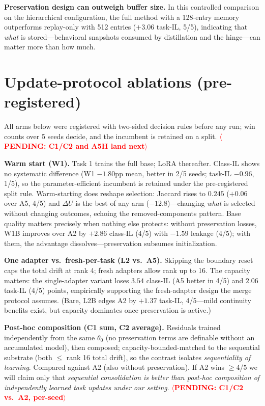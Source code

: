 \documentclass[11pt]{article}
\newcommand{\pending}[1]{\textcolor{red}{\textbf{$\langle$PENDING: #1$\rangle$}}}
\begin{document}
\textbf{Preservation design can outweigh buffer size.} In this controlled comparison on the hierarchical configuration, the full method with a 128-entry memory outperforms replay-only with 512 entries ($+3.06$ task-IL, 5/5), indicating that \emph{what} is stored---behavioral snapshots consumed by distillation and the hinge---can matter more than how much.

\section{Update-protocol ablations (pre-registered)}\label{sec:ablations}
All arms below were registered with two-sided decision rules before any run; win counts over 5 seeds decide, and the incumbent is retained on a split. \pending{C1/C2 and A5H land next}

\textbf{Warm start (W1).} Task 1 trains the full base; LoRA thereafter. Class-IL shows no systematic difference (W1 $-1.80$pp mean, better in 2/5 seeds; task-IL $-0.96$, 1/5), so the parameter-efficient incumbent is retained under the pre-registered split rule. Warm-starting does reshape selection: Jaccard rises to $0.245$ ($+0.06$ over A5, 4/5) and $\Delta U$ is the best of any arm ($-12.8$)---changing \emph{what} is selected without changing outcomes, echoing the removed-components pattern. Base quality matters precisely when nothing else protects: without preservation losses, W1B improves over A2 by $+2.86$ class-IL (4/5) with $-1.59$ leakage (4/5); with them, the advantage dissolves---preservation subsumes initialization.

\textbf{One adapter vs.\ fresh-per-task (L2 vs.\ A5).} Skipping the boundary reset caps the total drift at rank 4; fresh adapters allow rank up to 16. The capacity matters: the single-adapter variant loses $3.54$ class-IL (A5 better in 4/5) and $2.06$ task-IL (4/5) points, empirically supporting the fresh-adapter design the merge protocol assumes. (Bare, L2B edges A2 by $+1.37$ task-IL, 4/5---mild continuity benefits exist, but capacity dominates once preservation is active.)

\textbf{Post-hoc composition (C1 sum, C2 average).} Residuals trained independently from the same $\theta_0$ (no preservation terms are definable without an accumulated model), then composed; capacity-bounded-matched to the sequential substrate (both $\le$ rank 16 total drift), so the contrast isolates \emph{sequentiality of learning}. Compared against A2 (also without preservation). If A2 wins $\ge$4/5 we will claim only that \emph{sequential consolidation is better than post-hoc composition of independently learned task updates under our setting}. \pending{C1/C2 vs.\ A2, per-seed}
\end{document}
